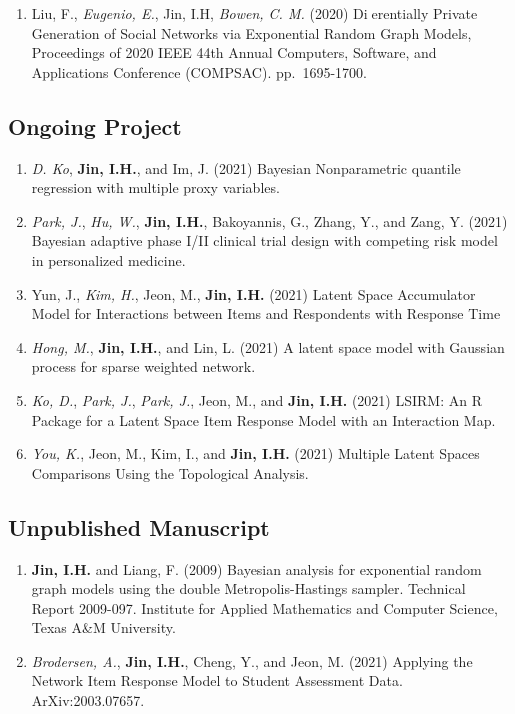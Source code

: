 \documentclass[
]{book}
\providecommand{\tightlist}{%
  \setlength{\itemsep}{0pt}\setlength{\parskip}{0pt}}
\begin{document}
\begin{enumerate}
\def\labelenumi{\arabic{enumi}.}
\tightlist
\item
  Liu, F., \emph{Eugenio, E.}, Jin, I.H, \emph{Bowen, C. M.} (2020) Dierentially Private Generation of Social Networks via Exponential Random Graph Models, Proceedings of 2020 IEEE 44th Annual Computers, Software, and Applications Conference (COMPSAC). pp.~1695-1700.
\end{enumerate}

\hypertarget{ongoing-project}{%
\subsection*{Ongoing Project}\label{ongoing-project}}

\begin{enumerate}
\def\labelenumi{\arabic{enumi}.}
\item
  \emph{D. Ko}, \textbf{Jin, I.H.}, and Im, J. (2021) Bayesian Nonparametric quantile regression with multiple proxy variables.
\item
  \emph{Park, J.}, \emph{Hu, W.}, \textbf{Jin, I.H.}, Bakoyannis, G., Zhang, Y., and Zang, Y. (2021) Bayesian adaptive phase I/II clinical trial design with competing risk model in personalized medicine.
\item
  Yun, J., \emph{Kim, H.}, Jeon, M., \textbf{Jin, I.H.} (2021) Latent Space Accumulator Model for Interactions between Items and Respondents with Response Time
\item
  \emph{Hong, M.}, \textbf{Jin, I.H.}, and Lin, L. (2021) A latent space model with Gaussian process for sparse weighted network.
\item
  \emph{Ko, D.}, \emph{Park, J.}, \emph{Park, J.}, Jeon, M., and \textbf{Jin, I.H.} (2021) LSIRM: An R Package for a Latent Space Item Response Model with an Interaction Map.
\item
  \emph{You, K.}, Jeon, M., Kim, I., and \textbf{Jin, I.H.} (2021) Multiple Latent Spaces Comparisons Using the Topological Analysis.
\end{enumerate}

\hypertarget{unpublished-manuscript}{%
\subsection{Unpublished Manuscript}\label{unpublished-manuscript}}

\begin{enumerate}
\def\labelenumi{\arabic{enumi}.}
\item
  \textbf{Jin, I.H.} and Liang, F. (2009) Bayesian analysis for exponential random graph models using the double Metropolis-Hastings sampler. Technical Report 2009-097. Institute for Applied Mathematics and Computer Science, Texas A\&M University.
\item
  \emph{Brodersen, A.}, \textbf{Jin, I.H.}, Cheng, Y., and Jeon, M. (2021) Applying the Network Item Response Model to Student Assessment Data. ArXiv:2003.07657.
\end{enumerate}
\end{document}
